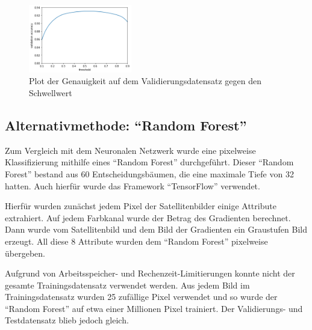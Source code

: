 \begin{figure}
    \centering
    \includegraphics[width=0.4\textwidth]{images/threshold.png}
    \caption{Plot der Genauigkeit auf dem Validierungsdatensatz gegen den Schwellwert}
    \label{fig:threshold}
\end{figure}

\subsection{Alternativmethode: \enquote{Random Forest}}
\label{ssec:Alternativmethode}

Zum Vergleich mit dem Neuronalen Netzwerk wurde eine pixelweise Klassifizierung mithilfe eines \enquote{Random Forest} durchgeführt.
Dieser \enquote{Random Forest} bestand aus 60 Entscheidungsbäumen, die eine maximale Tiefe von 32 hatten.
Auch hierfür wurde das Framework \enquote{TensorFlow} verwendet.\cite{tfdf}

Hierfür wurden zunächst jedem Pixel der Satellitenbilder einige Attribute extrahiert.
Auf jedem Farbkanal wurde der Betrag des Gradienten berechnet.
Dann wurde vom Satellitenbild und dem Bild der Gradienten ein Graustufen Bild erzeugt.
All diese 8 Attribute wurden dem \enquote{Random Forest} pixelweise übergeben.

Aufgrund von Arbeitsspeicher- und Rechenzeit-Limitierungen konnte nicht der gesamte Trainingsdatensatz verwendet werden.
Aus jedem Bild im Trainingsdatensatz wurden 25 zufällige Pixel verwendet und so wurde der \enquote{Random Forest} auf etwa einer Millionen Pixel trainiert.
Der Validierungs- und Testdatensatz blieb jedoch gleich.
